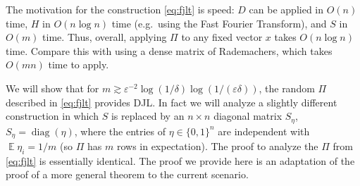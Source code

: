 \documentclass[12pt]{article}
\DeclareMathOperator*{\E}{\mathbb{E}}
\newcommand{\eps}{\varepsilon}
\newcommand{\Eqsub}[1]{\eqref{eq:#1}}
\begin{document}
The motivation for the construction \Eqsub{fjlt} is speed: $D$ can be applied in $O(n)$ time, $H$ in $O(n\log n)$ time (e.g.\ using the Fast Fourier Transform), and $S$ in $O(m)$ time. Thus, overall, applying $\Pi$ to any fixed vector $x$ takes $O(n\log n)$ time. Compare this with using a dense matrix of Rademachers, which takes $O(mn)$ time to apply.

We will show that for $m\gtrsim \eps^{-2}\log(1/\delta)\log(1/(\eps\delta))$, the random $\Pi$ described in \Eqsub{fjlt} provides DJL. In fact we will analyze a slightly different construction in which $S$ is replaced by an $n\times n$ diagonal matrix $S_\eta$, $S_\eta = \mathop{diag}(\eta)$, where the entries of $\eta\in\{0,1\}^n$ are independent with $\E \eta_i = 1/m$ (so $\Pi$ has $m$ rows in expectation). The proof to analyze the $\Pi$ from \Eqsub{fjlt} is essentially identical. The proof we provide here is an adaptation of the proof of a more general theorem \cite[Theorem 9]{CohenNW15} to the current scenario.
\end{document}
